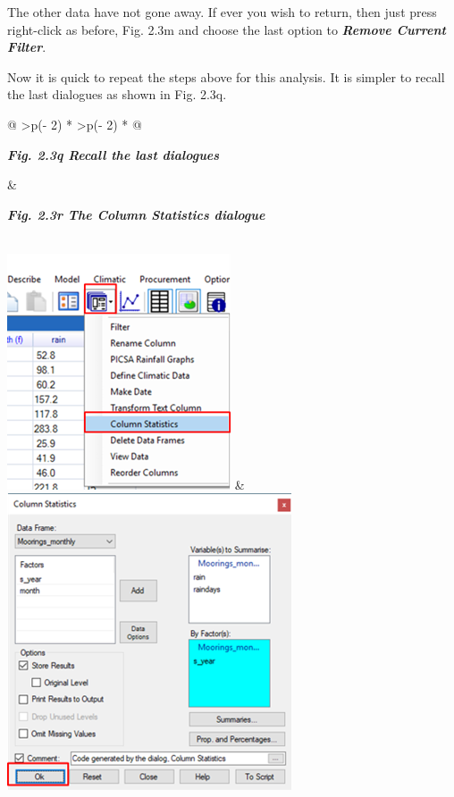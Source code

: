 \documentclass[
  letterpaper,
  DIV=11,
  numbers=noendperiod]{scrreprt}
\begin{document}
The other data have not gone away. If ever you wish to return, then just
press right-click as before, Fig. 2.3m and choose the last option to
\textbf{\emph{Remove Current Filter}}.

Now it is quick to repeat the steps above for this analysis. It is
simpler to recall the last dialogues as shown in Fig. 2.3q.

\begin{longtable}[]{@{}
  >{\centering\arraybackslash}p{(\columnwidth - 2\tabcolsep) * }
  >{\centering\arraybackslash}p{(\columnwidth - 2\tabcolsep) * }@{}}
\toprule\noalign{}
\begin{minipage}[b]{\linewidth}\centering
\textbf{\emph{Fig. 2.3q Recall the last dialogues}}
\end{minipage} & \begin{minipage}[b]{\linewidth}\centering
\textbf{\emph{Fig. 2.3r The Column Statistics dialogue}}
\end{minipage} \\
\midrule\noalign{}
\endhead
\bottomrule\noalign{}
\endlastfoot
\includegraphics[width=2.604in,height=2.746in]{figures/Fig2.3q.png} &
\includegraphics[width=3.315in,height=3.458in]{figures/Fig2.3r.png} \\
\end{longtable}
\end{document}
